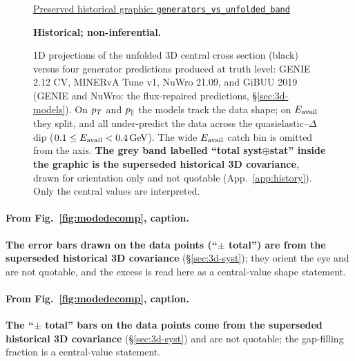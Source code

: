\begin{figure}[H]
  \centering
  \par\href{https://github.com/josephbaileyy/MINERvA-OmniFold/blob/3892e769043cddebfd58ec19e1ab1a567eb01784/docs/analysis-note/figures/generators_vs_unfolded_band.pdf}{Preserved historical graphic: \texttt{generators\_vs\_unfolded\_band}} \par\smallskip\textbf{Historical; non-inferential.}
  \caption{1D projections of the unfolded 3D central cross section (black) versus four generator predictions produced at truth level: GENIE 2.12 CV, MINERvA Tune v1, NuWro 21.09, and GiBUU 2019 (GENIE and NuWro: the flux-repaired predictions, \S\ref{sec:3d-models}). On $p_{T}$ and $p_{\parallel}$ the models track the data shape; on $E_{\mathrm{avail}}$ they split, and all under-predict the data across the quasielastic--$\Delta$ dip ($0.1\le E_{\mathrm{avail}}<\SI{0.4}{GeV}$). The wide $E_{\mathrm{avail}}$ catch bin is omitted from the axis. \textbf{The grey band labelled ``total syst$\oplus$stat'' inside the graphic is the superseded historical 3D covariance}, drawn for orientation only and not quotable (App.~\ref{app:history}). Only the central values are interpreted.}
  \label{fig:3dmodels-superseded}
\end{figure}

\paragraph{From Fig.~\ref{fig:modedecomp}, caption.} \textbf{The error bars drawn on the data points (``$\pm$ total'') are from the superseded historical 3D covariance} (\S\ref{sec:3d-syst}); they orient the eye and are not quotable, and the excess is read here as a central-value shape statement.

\paragraph{From Fig.~\ref{fig:modedecomp}, caption.} \textbf{The ``$\pm$ total'' bars on the data points come from the superseded historical 3D covariance} (\S\ref{sec:3d-syst}) and are not quotable; the gap-filling fraction is a central-value statement.

